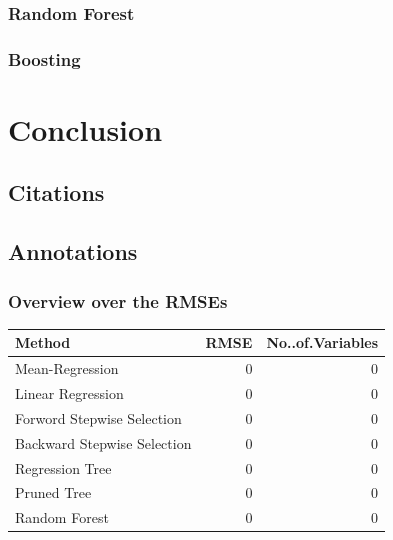 \documentclass[11pt,]{article}
\begin{document}
\hypertarget{random-forest}{%
\subsubsection{Random Forest}\label{random-forest}}

\hypertarget{boosting}{%
\subsubsection{Boosting}\label{boosting}}

\hypertarget{conclusion}{%
\section{Conclusion}\label{conclusion}}

\pagebreak

\hypertarget{citations}{%
\subsection{Citations}\label{citations}}

\pagebreak

\hypertarget{annotations}{%
\subsection{Annotations}\label{annotations}}

\hypertarget{overview-over-the-rmses}{%
\subsubsection{Overview over the RMSEs}\label{overview-over-the-rmses}}

\begin{tabular}{l|r|r}
\hline
Method & RMSE & No..of.Variables\\
\hline
Mean-Regression & 0 & 0\\
\hline
Linear Regression & 0 & 0\\
\hline
Forword Stepwise Selection & 0 & 0\\
\hline
Backward Stepwise Selection & 0 & 0\\
\hline
Regression Tree & 0 & 0\\
\hline
Pruned Tree & 0 & 0\\
\hline
Random Forest & 0 & 0\\
\hline
\end{tabular}
\renewcommand*{\mkbibnamefamily}[1]{\textbf{#1}}
\renewcommand*{\mkbibnamegiven}[1]{\textbf{#1}}
\renewcommand*{\mkbibnameprefix}[1]{\textbf{#1}}
\renewcommand*{\mkbibnamesuffix}[1]{\textbf{#1}}
\printbibliography[title=References]
\end{document}
